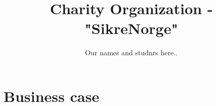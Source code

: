


\title{Charity Organization - "SikreNorge"}
\author{Our names and studnrs here..}



\maketitle


\thispagestyle{empty}

\clearpage
{}
\setcounter{page}{1}
\tableofcontents

\clearpage
{}


\section{Business case}


